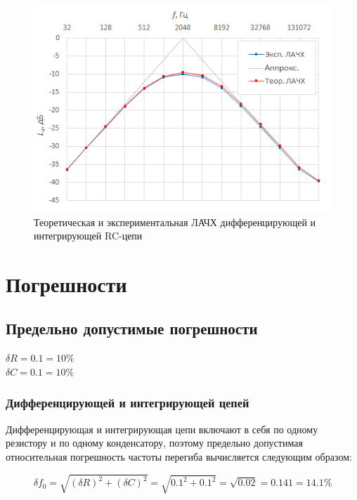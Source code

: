 \setlength{\belowcaptionskip}{0pt} %
\begin{figure}[H]
	\begin{center}
		\includegraphics[width=15cm]{img/3}
		\caption{Теоретическая и экспериментальная ЛАЧХ дифференцирующей и интегрирующей RC-цепи} 
		\label{t:e3} %
	\end{center}
\end{figure}

\section{Погрешности}

\subsection{Предельно допустимые погрешности}
\begin{center}
$\delta R = 0.1 = 10\%$\\
$\delta C = 0.1 = 10\%$\\
\end{center}

\subsubsection{Дифференцирующей и интегрирующей цепей}

Дифференцирующая и интегрирующая цепи включают в себя по одному резистору и по одному конденсатору, поэтому предельно допустимая относительная погрешность частоты перегиба вычисляется следующим образом:

\begin{equation}
\delta f_0 = \sqrt{(\delta R)^2 + (\delta C)^2} = \sqrt{0.1^2 + 0.1^2} = \sqrt{0.02} = 0.141 = 14.1 \%
\end{equation}

